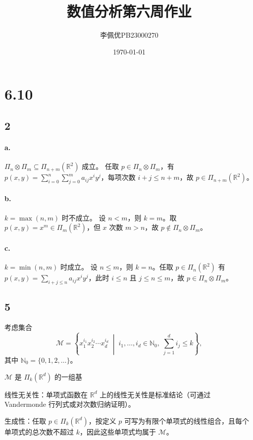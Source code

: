 \documentclass{article}
\title{数值分析第六周作业}
\date{\today}
\author{李佩优PB23000270}
\begin{document}
\maketitle
\section*{6.10}
\subsection*{2}

\paragraph{a.} $\Pi_n \otimes \Pi_m \subseteq \Pi_{n+m}(\mathbb{R}^2)$ 成立。
任取 $p \in \Pi_n \otimes \Pi_m$，有 $p(x,y)=\sum_{i=0}^{n}\sum_{j=0}^{m} a_{ij}x^i y^j$，每项次数 $i+j \le n+m$，故 $p \in \Pi_{n+m}(\mathbb{R}^2)$。

\paragraph{b.} $k=\max(n,m)$ 时不成立。
设 $n<m$，则 $k=m$。取 $p(x,y)=x^m \in \Pi_m(\mathbb{R}^2)$，但 $x$ 次数 $m>n$，故 $p \notin \Pi_n \otimes \Pi_m$。

\paragraph{c.} $k=\min(n,m)$ 时成立。
设 $n\le m$，则 $k=n$。任取 $p \in \Pi_n(\mathbb{R}^2)$ 有 $p(x,y)=\sum_{i+j\le n} a_{ij}x^i y^j$，此时 $i\le n$ 且 $j\le n\le m$，故 $p \in \Pi_n \otimes \Pi_m$。

\subsection*{5}
 
考虑集合
\[
\mathcal{M} = \left\{ x_1^{i_1} x_2^{i_2} \cdots x_d^{i_d} \;\middle|\; i_1, \dots, i_d \in \mathbb{N}_0,\; \sum_{j=1}^d i_j \le k \right\},
\]
其中 \(\mathbb{N}_0 = \{0,1,2,\dots\}\)。

\(\mathcal{M}\) 是 \(\Pi_k(\mathbb{R}^d)\) 的一组基

线性无关性：单项式函数在 \(\mathbb{R}^d\) 上的线性无关性是标准结论（可通过 Vandermonde 行列式或对次数归纳证明）。  

生成性：任取 \(p \in \Pi_k(\mathbb{R}^d)\)，按定义 \(p\) 可写为有限个单项式的线性组合，且每个单项式的总次数不超过 \(k\)，因此这些单项式均属于 \(\mathcal{M}\)。  
\end{document}
